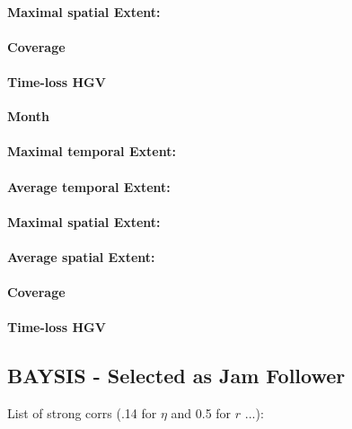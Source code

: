 \paragraph{Maximal spatial Extent:}
\paragraph{Coverage}
\paragraph{Time-loss HGV}

\large
\centerline{\textbf{Month}}
\normalsize

\paragraph{Maximal temporal Extent:}
\paragraph{Average temporal Extent:}
\paragraph{Maximal spatial Extent:}
\paragraph{Average spatial Extent:}
\paragraph{Coverage}
\paragraph{Time-loss HGV}

\subsection{BAYSIS - Selected as Jam Follower}

List of strong corrs (.14 for $\eta$ and 0.5 for $r$ ...):

